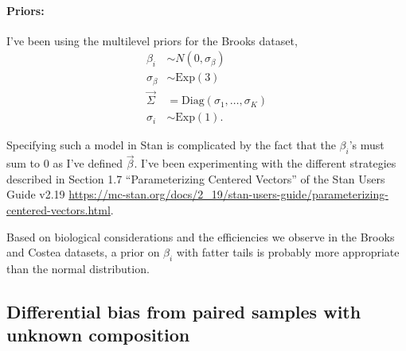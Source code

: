 \paragraph{Priors:}

I've been using the multilevel priors for the Brooks dataset,
\begin{align}
  \label{eq:priors}
  \beta_i &\sim N(0, \sigma_\beta)
  \\ \sigma_\beta &\sim \mathrm{Exp}(3)
  \\ \vec \Sigma &= \mathrm{Diag}(\sigma_1, \dots, \sigma_K)
  \\ \sigma_i &\sim \mathrm{Exp}(1).
\end{align}

Specifying such a model in Stan is complicated by the fact that the $\beta_i$'s
must sum to $0$ as I've defined $\vec \beta$. I've been experimenting with the
different strategies described in Section 1.7 ``Parameterizing Centered
Vectors'' of the Stan Users Guide v2.19
\url{https://mc-stan.org/docs/2_19/stan-users-guide/parameterizing-centered-vectors.html}.

Based on biological considerations and the efficiencies we observe in the
Brooks and Costea datasets, a prior on $\beta_i$ with fatter tails is probably
more appropriate than the normal distribution.

\subsection{Differential bias from paired samples with unknown composition}

